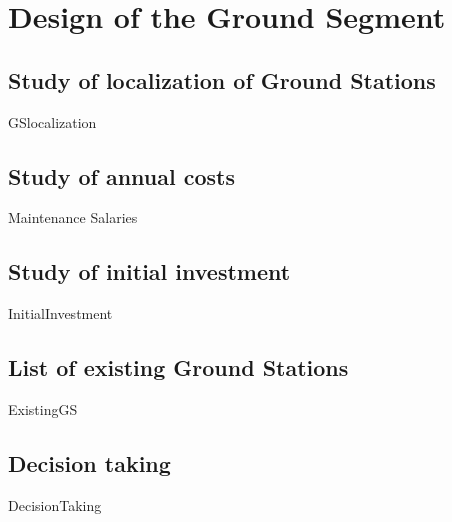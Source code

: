 \chapter{Design of the Ground Segment}

\section{Study of localization of Ground Stations}
{GSlocalization}

\section{Study of annual costs}
{Maintenance}
{Salaries}

\section{Study of initial investment}
{InitialInvestment}

\section{List of existing Ground Stations}
{ExistingGS}

\section{Decision taking}
{DecisionTaking}